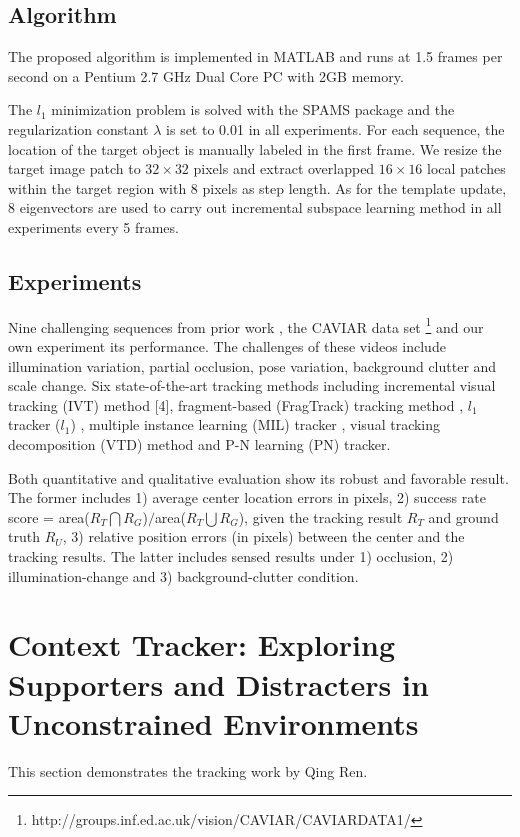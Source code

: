 \documentclass{article}
\begin{document}
\subsection{Algorithm}
The proposed algorithm is implemented in MATLAB and runs at 1.5 frames per second on a Pentium 2.7 GHz Dual Core PC with 2GB memory.

The $l_1$ minimization problem is solved with the SPAMS package and the regularization constant $\lambda$ is set to 0.01 in all experiments. For each sequence, the location of the target object is manually labeled in the first frame. We resize the target image patch to $32\times 32$ pixels and extract overlapped $16\times16$ local patches within the target region with 8 pixels as step length. As for the template update, 8 eigenvectors are used to carry out incremental subspace learning method in all experiments every 5 frames.

\subsection{Experiments}
\label{sec:asla_section}
Nine challenging sequences from prior work \cite{shi1,shi2,shi3,shi4,shi5}, the CAVIAR data set \footnote{http://groups.inf.ed.ac.uk/vision/CAVIAR/CAVIARDATA1/} and our own experiment its performance. The challenges of these videos include illumination variation, partial occlusion, pose variation, background clutter and scale change. Six state-of-the-art tracking methods including incremental visual tracking (IVT) method [4], fragment-based (FragTrack) tracking method \cite{shi1}, $l_1$ tracker ($l_1$) \cite{shi6}, multiple instance learning (MIL) tracker \cite{shi2}, visual tracking decomposition (VTD) method \cite{shi3} and P-N learning (PN) tracker. \cite{shi7}

Both quantitative and qualitative evaluation show its robust and favorable result. The former includes 1) average center location errors in pixels, 2)
success rate score = area($R_T \bigcap R_G$)$/$area($R_T \bigcup R_G$), given the tracking result $R_T$ and ground truth $R_U$, 3) relative position errors (in pixels) between the center and the tracking results. The latter includes sensed results under 1) occlusion, 2) illumination-change and 3) background-clutter condition.


\section{Context Tracker: Exploring Supporters and Distracters in Unconstrained Environments}
This section demonstrates the tracking work by Qing Ren.
\end{document}
